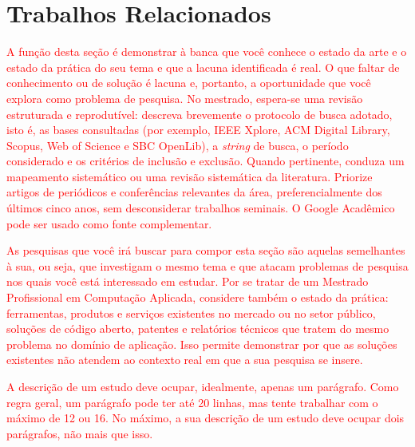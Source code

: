\section{Trabalhos Relacionados}
\label{sec:trabalhos-re}



\textcolor{red}{A função desta seção é demonstrar à banca que você conhece o estado da arte e o estado da prática do seu tema e que a lacuna identificada é real. O que faltar de conhecimento ou de solução é lacuna e, portanto, a oportunidade que você explora como problema de pesquisa. No mestrado, espera-se uma revisão estruturada e reprodutível: descreva brevemente o protocolo de busca adotado, isto é, as bases consultadas (por exemplo, IEEE Xplore, ACM Digital Library, Scopus, Web of Science e SBC OpenLib), a \textit{string} de busca, o período considerado e os critérios de inclusão e exclusão. Quando pertinente, conduza um mapeamento sistemático ou uma revisão sistemática da literatura. Priorize artigos de periódicos e conferências relevantes da área, preferencialmente dos últimos cinco anos, sem desconsiderar trabalhos seminais. O Google Acadêmico pode ser usado como fonte complementar.}

\textcolor{red}{As pesquisas que você irá buscar para compor esta seção são aquelas semelhantes à sua, ou seja, que investigam o mesmo tema e que atacam problemas de pesquisa nos quais você está interessado em estudar. Por se tratar de um Mestrado Profissional em Computação Aplicada, considere também o estado da prática: ferramentas, produtos e serviços existentes no mercado ou no setor público, soluções de código aberto, patentes e relatórios técnicos que tratem do mesmo problema no domínio de aplicação. Isso permite demonstrar por que as soluções existentes não atendem ao contexto real em que a sua pesquisa se insere.}

\textcolor{red}{A descrição de um estudo deve ocupar, idealmente, apenas um parágrafo. Como regra geral, um parágrafo pode ter até 20 linhas, mas tente trabalhar com o máximo de 12 ou 16. No máximo, a sua descrição de um estudo deve ocupar dois parágrafos, não mais que isso.}

